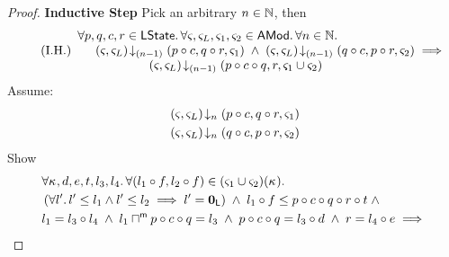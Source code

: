 \begin{lemma}[]
\begin{proof}
\noindent
\textbf{}
\textbf{Inductive Step} Pick an arbitrary $n \in \mathbb{N}$, then
%
\begin{equation}
	\tag{I.H.}
	\begin{array}{l}
		\forall p, q, c, r \in \textsf{LState}.\, \forall \varsigma_{}, \varsigma_{L}, \varsigma_{1}, \varsigma_{2} \in \textsf{AMod}.\, \forall n \in \mathbb{N}.\,\\
		\hspace*{0.5cm} \left(\varsigma_{}, \varsigma_{L}\right) \!\downarrow_{(n-1)} \left(p \circ c, q \circ r, \varsigma_{1}\right) \;\land\; \left(\varsigma_{}, \varsigma_{L}\right) \!\downarrow_{(n-1)} \left(q \circ c, p \circ r, \varsigma_{2}\right)
		\implies\\
		\hspace*{2cm} \left(\varsigma_{}, \varsigma_{L}\right) \!\downarrow_{(n-1)} \left(p \circ c \circ q, r, \varsigma_{1} \cup \varsigma_{2}\right)
	\end{array}
\label{LM:I.H}
\end{equation}
%
Assume:
%
\begin{align}
	& \left(\varsigma_{}, \varsigma_{L}\right) \!\downarrow_{n} \left(p \circ c, q \circ r, \varsigma_{1}\right) \label{LM:Ass6}\\
	& \left(\varsigma_{}, \varsigma_{L}\right) \!\downarrow_{n} \left(q \circ c, p \circ r, \varsigma_{2}\right) \label{LM:Ass7}
\end{align}
%
Show
%
\begin{align}
	&\for{\ca{}, d, e, t, l_3, l_4}\for{(l_1 \composeL f, l_2 \composeL f) \in (\amod{1} \cup \amod{2})(\ca{})} \nonumber\\
	& \left(\for{l'} l' \leq l_1 \land l' \leq l_2 \implies l' = \unitL\right) \;\land\; l_1 \composeL f \leq  p  \composeL c \composeL q \composeL r \composeL t \;\land \nonumber\\
	& l_1 = l_3 \composeL l_4 \;\land\; l_1 \maxMeetL p \composeL c \composeL q = l_3 \;\land\; p \composeL c \composeL q = l_3 \composeL d \;\land\; r = l_4 \composeL e \implies \nonumber\\

\end{align}
\end{proof}
\end{lemma}

